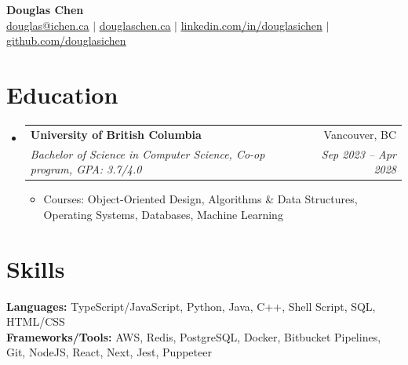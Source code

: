 \documentclass[letterpaper,11pt]{article}
\makeatletter
\newcommand{\resumeItem}[1]{
  \item\small{
    {#1 \vspace{-0.6pt}}
  }
}
\newcommand{\resumeSubheading}[4]{
  \vspace{0pt}\item
    \begin{tabular*}{0.97\textwidth}[t]{l@{\extracolsep{\fill}}r}
      \textbf{#1} & #2 \\
      \textit{\small#3} & \textit{\small #4} \\
    \end{tabular*}\vspace{-7pt}
}
\newcommand{\resumeSubHeadingListStart}{\begin{itemize}[leftmargin=0.15in, label={}]}
\newcommand{\resumeSubHeadingListEnd}{\end{itemize}}
\newcommand{\resumeItemListStart}{\begin{itemize}}
\newcommand{\resumeItemListEnd}{\end{itemize}\vspace{-7pt}}
\makeatother
\begin{document}
\begin{center}
    \textbf{\Huge Douglas Chen} \\ \vspace{1pt}
    \href{mailto:douglas@ichen.ca}{\underline{douglas@ichen.ca}} $|$
    \href{https://www.douglaschen.ca/}{\underline{douglaschen.ca}} $|$
    \href{https://www.linkedin.com/in/douglasichen/}{\underline{linkedin.com/in/douglasichen}} $|$
    \href{https://www.github.com/douglasichen}{\underline{github.com/douglasichen}}
\end{center}

\section{Education}
  \resumeSubHeadingListStart
    \resumeSubheading
      {University of British Columbia}{Vancouver, BC}
      {Bachelor of Science in Computer Science, Co-op program, GPA: 3.7/4.0}{Sep 2023 -- Apr 2028}
      \resumeItemListStart
        \resumeItem{Courses: Object-Oriented Design, Algorithms \& Data Structures, Operating Systems, Databases, Machine Learning}
      \resumeItemListEnd
  \resumeSubHeadingListEnd

\section{Skills}
 \begin{itemize}[leftmargin=0.15in, label={}]
    \small{\item{
         \textbf{Languages:}{ TypeScript/JavaScript, Python, Java, C++, Shell Script, SQL, HTML/CSS} \\
     \textbf{Frameworks/Tools:}{ AWS, Redis, PostgreSQL, Docker, Bitbucket Pipelines, Git, NodeJS, React, Next, Jest, Puppeteer}
    }}
 \end{itemize}
\end{document}

